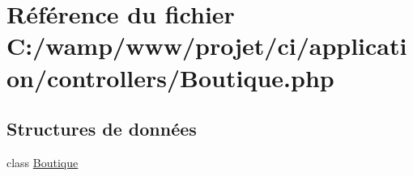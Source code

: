 \hypertarget{_boutique_8php}{}\section{Référence du fichier C\+:/wamp/www/projet/ci/application/controllers/\+Boutique.php}
\label{_boutique_8php}
\subsection*{Structures de données}
\begin{DoxyCompactItemize}
\item 
class \mbox{\hyperlink{class_boutique}{Boutique}}
\end{DoxyCompactItemize}
